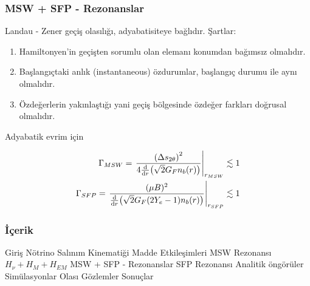 \documentclass[10pt]{beamer}
\begin{document}
\begin{frame}
    \frametitle{MSW + SFP - Rezonanslar}
    Landau - Zener geçiş olasılığı, adyabatisiteye bağlıdır. Şartlar:
    \scriptsize
    \begin{enumerate}
        \item Hamiltonyen'in geçişten sorumlu olan elemanı konumdan bağımsız olmalıdır.
        \item Başlangıçtaki anlık (instantaneous) özdurumlar, başlangıç durumu ile aynı olmalıdır.
        \item Özdeğerlerin yakınlaştığı yani geçiş bölgesinde özdeğer farkları doğrusal olmalıdır.
    \end{enumerate}
    \normalsize

    \hrulefill
    
    Adyabatik evrim için 

    \begin{align*}
        \Gamma_{MSW} = \eval{\frac{\qty(\Delta s_{2\theta})^{2}}{4\dv{r}(\sqrt{2}G_{F}n_{b}(r)) }}_{r_{MSW}} \lesssim 1 \\
        \Gamma_{SFP} = \eval{\frac{(\mu B)^{2}}{\dv{r}(\sqrt{2}G_{F}(2Y_{e}-1)n_{b}(r))} }_{r_{SFP}}\lesssim 1
    \end{align*}

\end{frame}

\begin{frame}
    \frametitle{İçerik}
    \begin{outline}
        \1[\checkmark] Giriş
        \1[\checkmark] Nötrino Salınım Kinematiği
        \1[\checkmark] Madde Etkileşimleri
        \2[\checkmark] MSW Rezonansı
        \1[\checkmark] $H_{\nu}+ H_{M}+ H_{EM}$
        \1[\checkmark] MSW + SFP - Rezonanslar
        \2[\checkmark] SFP Rezonansı
        \1[\textbullet] Analitik öngörüler
        \1[\textbullet] Simülasyonlar
        \1[\textbullet] Olası Gözlemler
        \1[\textbullet] Sonuçlar
    \end{outline}
\end{frame}
\end{document}
